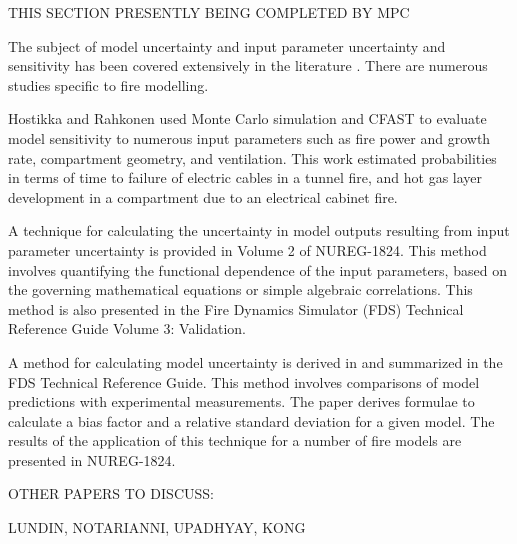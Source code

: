 
THIS SECTION PRESENTLY BEING COMPLETED BY MPC

The subject of model uncertainty and input parameter uncertainty and sensitivity has been covered extensively in the literature \cite{Spiegel, Vose, Kumamoto, Haimes}.  There are numerous studies specific to fire modelling.  

Hostikka and Rahkonen \cite{Hostikka:2003a} used Monte Carlo simulation and CFAST to evaluate model sensitivity to numerous  input parameters such as fire power and growth rate, compartment geometry, and ventilation. This work estimated probabilities in terms of time to failure of electric cables in a tunnel fire, and hot gas layer development  in a compartment due to an electrical cabinet fire. 

A technique for calculating the uncertainty in model outputs resulting  from input parameter uncertainty is provided in Volume 2 of NUREG-1824. This method involves quantifying the functional dependence of the input parameters, based on the governing mathematical equations or simple algebraic correlations. This method is also presented in the Fire Dynamics Simulator (FDS) Technical Reference Guide Volume 3: Validation.

A method for calculating model uncertainty is derived in \cite{McGrattan2011a} and summarized in the FDS Technical Reference Guide. This method involves comparisons of model predictions with experimental measurements. The paper derives formulae to calculate  a bias factor and a relative standard deviation for a given model.  The results of the application of this technique for a number of fire models are presented in NUREG-1824.


OTHER PAPERS TO DISCUSS:

LUNDIN, NOTARIANNI, UPADHYAY, KONG









%
% 
% 
% 
% 
% 
 
 
 
 

 
 
 
 
 



